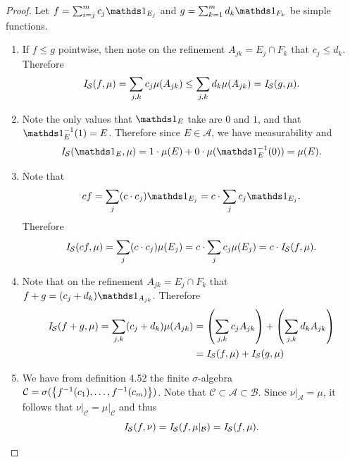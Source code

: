 \documentclass[hw_all.tex]{subfiles}
\begin{document}
\begin{proof}
    Let $f = \sum_{i=j}^m c_j \ind{E_j}$ and $g = \sum_{k=1}^m d_k \ind{F_k}$ be simple functions.
    \begin{enumerate}
        \item
            If $f \leq g$ pointwise, then note on the refinement $A_{jk} = E_j \cap F_k$ that $c_j \leq d_k$. Therefore
            \[
                \mathit{I}_{\mathcal{S}}(f, \mu) = \sum_{j,k} c_j \mu(A_{jk}) \leq \sum_{j,k} d_k \mu(A_{jk}) = \mathit{I}_{\mathcal{S}}(g, \mu)
            .\]

        \item 
            Note the only values that $\ind{E}$ take are $0$ and $1$, and that $\ind{E}^{-1}(1) = E$. Therefore since $E \in \mathcal{A}$, we have measurability and
            \[
                \sint(\ind{E}, \mu) = 1 \cdot \mu(E) + 0 \cdot \mu(\ind{E}^{-1}(0)) = \mu(E)
            .\]

        \item 
            Note that
            \[
                cf = \sum_{j} (c \cdot c_j) \ind{E_j} = c \cdot \sum_{j} c_j \ind{E_j}
            .\]
            Therefore
            \[
                \mathit{I}_{\mathcal{S}}(cf, \mu) = \sum_{j} (c \cdot c_j) \mu(E_j) = c \cdot \sum_{j} c_j \mu(E_j) = c\cdot\mathit{I}_{\mathcal{S}}(f, \mu)
            .\]

        \item 
            Note that on the refinement $A_{jk} = E_j \cap F_k$ that $f + g = (c_j + d_k) \ind{A_{jk}}$. Therefore
            \begin{align*}
                \mathit{I}_{\mathcal{S}}(f+g, \mu) = \sum_{j,k} (c_j + d_k) \mu(A_{jk}) &= \qty(\sum_{j,k} c_j A_{jk}) + \qty(\sum_{j,k} d_k A_{jk}) \\
                &= \mathit{I}_{\mathcal{S}}(f,\mu) + \mathit{I}_{\mathcal{S}}(g, \mu)
            \end{align*}

        \item 
            We have from definition 4.52 the finite $\sigma$-algebra $\mathcal{C} = \sigma(\qty{f^{-1}(c_1), \ldots, f^{-1}(c_m)})$. Note that $\mathcal{C} \subset \mathcal{A} \subset \mathcal{B}$. Since $\nu \vert_\mathcal{A} = \mu$, it follows that $\nu \vert_{\mathcal{C}} = \mu \vert_{\mathcal{C}}$ and thus
            \[
                \mathit{I}_{\mathcal{S}}(f, \nu) = \mathit{I}_{\mathcal{S}}(f, \mu\vert_\mathcal{B}) = \mathit{I}_{\mathcal{S}}(f, \mu)
            .\]


\end{enumerate}
\end{proof}
\end{document}
